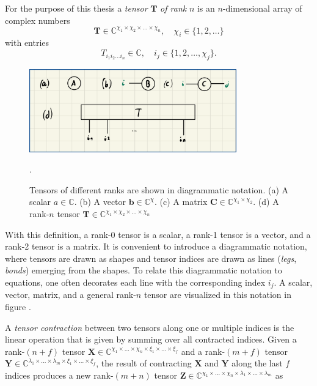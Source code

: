 For the purpose of this thesis a \textit{tensor} $\bm{T}$ \textit{of rank} $n$ is an $n$-dimensional array of complex numbers
\begin{equation}
	\bm{T} \in \mathbb{C}^{\chi_1\times\chi_2\times\dots\times\chi_n}, \quad \chi_i \in \{1, 2, \dots\}
\end{equation}
with entries
\begin{equation}
	T_{i_1i_2\dots i_n} \in \mathbb{C}, \quad i_j \in \{1, 2, \dots, \chi_j\}.
\end{equation}
\begin{figure}
	\centering
	\includegraphics[width=0.8\textwidth]{figures/Tensor_Networks/basic_tensor_diagrams.jpeg}
	\caption{Tensors of different ranks are shown in diagrammatic notation. (a) A scalar $a\in\mathbb{C}$. (b) A vector $\bm{b}\in\mathbb{C}^{\chi}$. (c) A matrix $\bm{C}\in\mathbb{C}^{\chi_1\times\chi_2}$. (d) A rank-$n$ tensor $\bm{T}\in\mathbb{C}^{\chi_1\times\chi_2\times\dots\times\chi_n}$}.
	\label{fig:basic_tensor_diagrams}
\end{figure}
With this definition, a rank-0 tensor is a scalar, a rank-1 tensor is a vector, and a rank-2 tensor is a matrix. It is convenient to introduce a diagrammatic notation, where tensors are drawn as shapes and tensor indices are drawn as lines (\textit{legs}, \textit{bonds}) emerging from the shapes. To relate this diagrammatic notation to equations, one often decorates each line with the corresponding index $i_j$. A scalar, vector, matrix, and a general rank-$n$ tensor are visualized in this notation in figure .\par
A \textit{tensor contraction} between two tensors along one or multiple indices is the linear operation that is given by summing over all contracted indices. Given a rank-$(n+f)$ tensor $\bm{X} \in \mathbb{C}^{\chi_1\times\dots\times\chi_n\times\xi_{1}\times\dots\times\xi_{f}}$ and a rank-$(m+f)$ tensor $\bm{Y} \in \mathbb{C}^{\lambda_1\times\dots\times\lambda_m\times\xi_1\times\dots\times\xi_f}$, the result of contracting $\bm{X}$ and $\bm{Y}$ along the last $f$ indices produces a new rank-$(m+n)$ tensor $\bm{Z} \in \mathbb{C}^{\chi_1\times\dots\times\chi_n\times\lambda_1\times\dots\times\lambda_m}$ as
